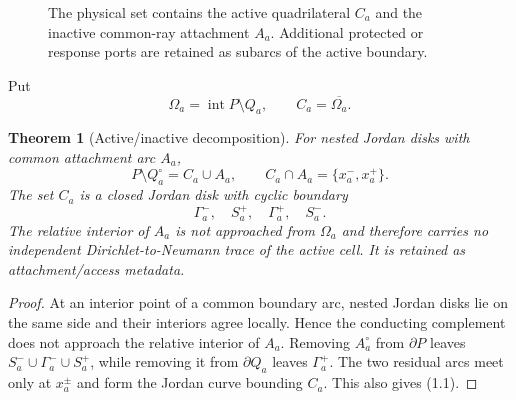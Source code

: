 \documentclass[11pt]{article}
\newtheorem{theorem}{Theorem}[section]
\theoremstyle{definition}
\theoremstyle{remark}
\begin{document}
\begin{figure}[htbp]
\centering
{}
\caption{The physical set contains the active quadrilateral $C_a$ and the
inactive common-ray attachment $A_a$.  Additional protected or response ports
are retained as subarcs of the active boundary.}
\label{fig:physical-cell}
\end{figure}

Put
\[
 \Omega_a=\operatorname{int}P\setminus Q_a,
 \qquad C_a=\overline{\Omega_a}.
\]

\begin{theorem}[Active/inactive decomposition]
For nested Jordan disks with common attachment arc $A_a$,
\[
 \boxed{P\setminus Q_a^\circ=C_a\cup A_a,
 \qquad C_a\cap A_a=\{x_a^-,x_a^+\}.}
 \tag{1.1}
\]
The set $C_a$ is a closed Jordan disk with cyclic boundary
\[
 \Gamma_a^-,\quad S_a^+,\quad\Gamma_a^+,\quad S_a^-.
 \tag{1.2}
\]
The relative interior of $A_a$ is not approached from $\Omega_a$ and therefore
carries no independent Dirichlet-to-Neumann trace of the active cell.  It is
retained as attachment/access metadata.
\end{theorem}

\begin{proof}
At an interior point of a common boundary arc, nested Jordan disks lie on the
same side and their interiors agree locally.  Hence the conducting complement
does not approach the relative interior of $A_a$.  Removing $A_a^\circ$ from
$\partial P$ leaves $S_a^-\cup\Gamma_a^-\cup S_a^+$, while removing it from
$\partial Q_a$ leaves $\Gamma_a^+$.  The two residual arcs meet only at
$x_a^\pm$ and form the Jordan curve bounding $C_a$.  This also gives (1.1).
\end{proof}
\end{document}
